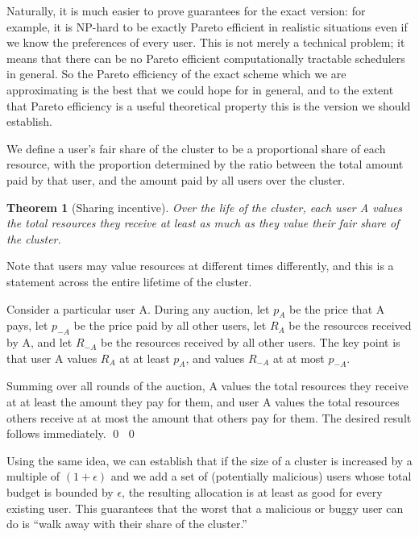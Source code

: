 \documentclass{acm_proc_article-sp}
\newtheorem{theorem}{Theorem}[section]
\newenvironment{pproof}[1][Proof]{\begin{trivlist}
\item[\hskip \labelsep {\bfseries #1}]}{\end{trivlist}}
\begin{document}
Naturally, it is much easier to prove guarantees for the exact version: for example, it is NP-hard to be exactly Pareto efficient in realistic
situations
even if we know the preferences of every user.
This is not merely a technical problem; it means that there can be no Pareto efficient computationally tractable schedulers in general.
So the Pareto efficiency of the exact scheme which we are approximating is the best that we could hope for in general,
and to the extent that Pareto efficiency is a useful theoretical property this is the version we should establish.

We define a user's fair share of the cluster to be a proportional share of each resource, with the proportion determined by the ratio between the total amount paid by that user, and the amount paid by all users over the cluster. 
\vspace{-5mm}
\begin{theorem}[Sharing incentive]
Over the life of the cluster, each user A values the total resources they receive at least as much as they value their fair share of the cluster. 
\end{theorem}
\vspace{-5mm}
Note that users may value resources at different times differently, and this is a statement across the entire lifetime of the cluster.
\vspace{-5mm}
\begin{pproof}
Consider a particular user A. 
During any auction, let $p_A$ be the price that A pays, let $p_{-A}$ be the price paid by all other users, let $R_A$ be the resources received by A, 
and let $R_{-A}$ be the resources received by all other users. The key point is that user A values $R_A$ at at least $p_A$, and values $R_{-A}$ at at most $p_{-A}$. 

Summing over all rounds of the auction, A values the total resources they receive at at least the amount they pay for them, 
and user A values the total resources others receive at at most the amount that others pay for them. The desired result follows immediately. \qed
\qed
\end{pproof}

Using the same idea, we can establish that if the size of a cluster is increased by a multiple of $(1 + \epsilon)$ and we add a set of (potentially malicious) users whose total
budget is bounded by $\epsilon$, the resulting allocation is at least as good for every existing user.
This guarantees that the worst that a malicious or buggy user can do is ``walk away with their share of the cluster.''
\end{document}
